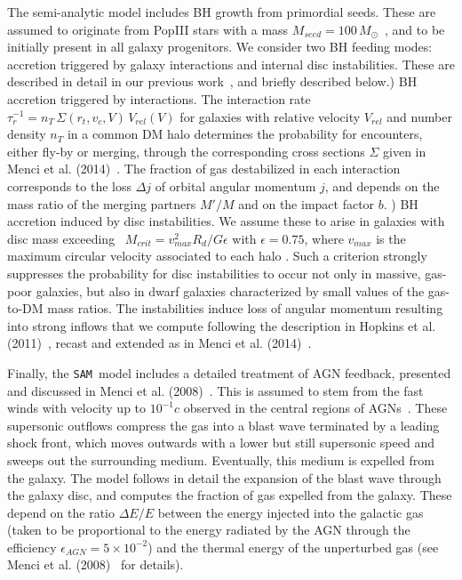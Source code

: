 \documentclass{natureprintstyle}
\newcommand{\sam}{\texttt{SAM}}
\begin{document}
The semi-analytic model includes BH growth from primordial seeds. These are assumed to originate from PopIII stars with a mass $M_{seed}=100\,M_{\odot}$~\cite{Madau2001}, and to be initially present in all galaxy progenitors. We consider two BH feeding modes: accretion triggered by galaxy interactions and internal disc instabilities. These are described in detail in our previous work~\cite{Menci2016}, and briefly described below.) BH accretion triggered by interactions. The interaction rate $\tau_r^{-1}=n_T\,\Sigma (r_t,v_c,V)\,V_{rel} (V)$ for galaxies with relative velocity $V_{rel}$ and number density $n_T$ in a common DM halo determines the probability for encounters, 
either fly-by or  merging, through the corresponding cross sections $\Sigma$ given in Menci et al. (2014)~\cite{Menci2014}. The fraction of
gas destabilized in each interaction corresponds to the loss $\Delta j$ of orbital angular momentum $j$, and depends on the mass ratio of the merging partners $M'/M$ and on the impact factor $b$. ) BH accretion induced by disc instabilities. We assume these to arise  in  galaxies with disc mass exceeding~\cite{Efstathiou1982} $M_{crit} =  {v_{max}^2 R_{d}/ G \epsilon}$ with $\epsilon=0.75$, where $v_{max}$ is the maximum circular velocity associated to each halo \cite{Mo1998}. 
Such a criterion strongly suppresses the probability for disc instabilities to occur not only in massive, gas-poor galaxies, but also in 
dwarf galaxies characterized by small values of the gas-to-DM mass ratios.
The instabilities induce loss of angular momentum resulting into strong inflows that we compute following the 
description in Hopkins et al. (2011)~\cite{Hopkins2011}, recast and extended as in Menci et al. (2014)~\cite{Menci2014}. 

Finally, the \sam\ model includes a detailed treatment of AGN feedback, presented and discussed in Menci et al. (2008)~\cite{Menci2008}.
This is assumed to stem from the fast winds with velocity up to
$10^{-1}c$ observed in the central regions of AGNs~\cite{Chartas2002, Pounds2003}.  
These supersonic outflows compress the gas into a blast wave terminated by
a leading shock front, which  moves outwards with a lower but still
supersonic speed and sweeps out the surrounding medium. Eventually,
this medium is expelled from the galaxy. The model follows in detail the expansion of the 
blast wave through the galaxy disc, and computes the fraction of gas expelled from the galaxy.  
These depend on the ratio $\Delta E/E$ between the  energy injected into the galactic gas 
(taken to be proportional to the energy radiated by the 
AGN through the efficiency {\color{red} $\epsilon_{AGN}=5\times 10^{-2}$) }
and the thermal energy of the unperturbed gas (see Menci et al. (2008)~\cite{Menci2008} for details). 
\end{document}
